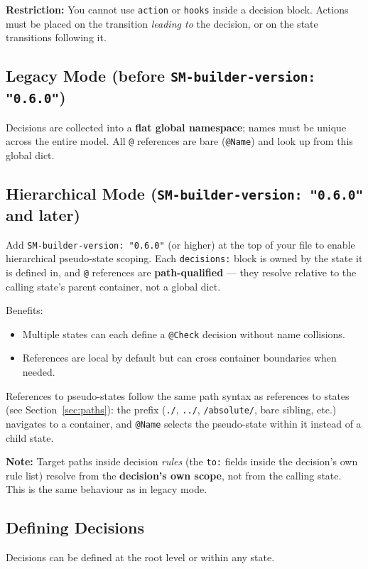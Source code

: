 \documentclass[a4paper,11pt]{article}
\begin{document}
\textbf{Restriction:} You cannot use \texttt{action} or \texttt{hooks} inside a decision block. Actions must be placed on the transition \textit{leading to} the decision, or on the state transitions following it.

\subsection{Legacy Mode (before \texttt{SM-builder-version: "0.6.0"})}
Decisions are collected into a \textbf{flat global namespace}; names must be unique across the entire model. All \texttt{@} references are bare (\texttt{@Name}) and look up from this global dict.

\subsection{Hierarchical Mode (\texttt{SM-builder-version: "0.6.0"} and later)}
\label{sec:hier}
Add \texttt{SM-builder-version: "0.6.0"} (or higher) at the top of your file to enable hierarchical pseudo-state scoping. Each \texttt{decisions:} block is owned by the state it is defined in, and \texttt{@} references are \textbf{path-qualified} — they resolve relative to the calling state's parent container, not a global dict.

Benefits:
\begin{itemize}
  \item Multiple states can each define a \texttt{@Check} decision without name collisions.
  \item References are local by default but can cross container boundaries when needed.
\end{itemize}

References to pseudo-states follow the same path syntax as references to states (see Section~\ref{sec:paths}): the prefix (\texttt{./}, \texttt{../}, \texttt{/absolute/}, bare sibling, etc.) navigates to a container, and \texttt{@Name} selects the pseudo-state within it instead of a child state.

\textbf{Note:} Target paths inside decision \emph{rules} (the \texttt{to:} fields inside the decision's own rule list) resolve from the \textbf{decision's own scope}, not from the calling state. This is the same behaviour as in legacy mode.

\subsection{Defining Decisions}
Decisions can be defined at the root level or within any state.
\end{document}
